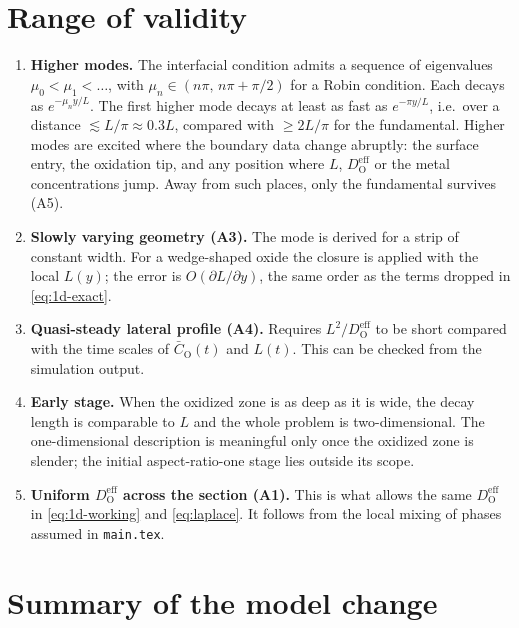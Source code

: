 \documentclass[12pt]{article}
\newcommand{\eff}{\mathrm{eff}}
\newcommand{\Ox}{\mathrm{O}}
\newcommand{\D}{D_{\Ox}^{\eff}}
\newcommand{\Cb}{\bar{C}_{\Ox}}
\begin{document}
\section{Range of validity}
\label{sec:validity}

\begin{enumerate}
  \item \textbf{Higher modes.} The interfacial condition admits a sequence of
        eigenvalues $\mu_0<\mu_1<\dots$, with $\mu_n\in(n\pi,\,n\pi+\pi/2)$ for a
        Robin condition. Each decays as $e^{-\mu_n y/L}$. The first higher mode decays
        at least as fast as $e^{-\pi y/L}$, i.e.\ over a distance $\lesssim L/\pi
        \approx0.3L$, compared with $\ge2L/\pi$ for the fundamental. Higher modes are
        excited where the boundary data change abruptly: the surface entry, the
        oxidation tip, and any position where $L$, $\D$ or the metal concentrations
        jump. Away from such places, only the fundamental survives (A5).
  \item \textbf{Slowly varying geometry (A3).} The mode is derived for a strip of
        constant width. For a wedge-shaped oxide the closure is applied with the local
        $L(y)$; the error is $O(\partial L/\partial y)$, the same order as the terms
        dropped in \eqref{eq:1d-exact}.
  \item \textbf{Quasi-steady lateral profile (A4).} Requires $L^2/\D$ to be short
        compared with the time scales of $\Cb(t)$ and $L(t)$. This can be checked
        from the simulation output.
  \item \textbf{Early stage.} When the oxidized zone is as deep as it is wide, the
        decay length is comparable to $L$ and the whole problem is two-dimensional.
        The one-dimensional description is meaningful only once the oxidized zone is
        slender; the initial aspect-ratio-one stage lies outside its scope.
  \item \textbf{Uniform $\D$ across the section (A1).} This is what allows the same
        $\D$ in \eqref{eq:1d-working} and \eqref{eq:laplace}. It follows from the
        local mixing of phases assumed in \texttt{main.tex}.
\end{enumerate}

\section{Summary of the model change}
\label{sec:summary}
\end{document}
